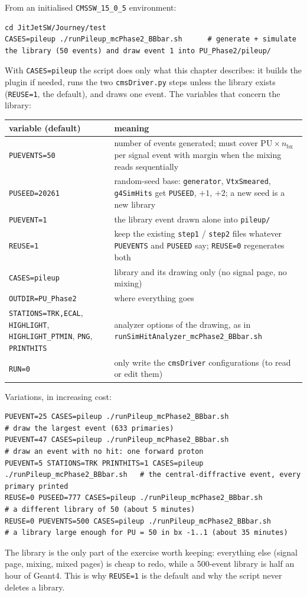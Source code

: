 \documentclass[11pt,a4paper]{article}
\newcommand{\code}[1]{\texttt{#1}}
\newcommand{\bx}{\ensuremath{\mathrm{bx}}}
\begin{document}
From an initialised \code{CMSSW\_15\_0\_5} environment:
\begin{lstlisting}[style=sh]
cd JitJetSW/Journey/test
CASES=pileup ./runPileup_mcPhase2_BBbar.sh      # generate + simulate the library (50 events) and draw event 1 into PU_Phase2/pileup/
\end{lstlisting}
With \code{CASES=pileup} the script does only what this chapter describes: it builds the plugin if needed,
runs the two \code{cmsDriver.py} steps unless the library exists (\code{REUSE=1}, the default), and draws
one event. The variables that concern the library:
\begin{center}\small
\begin{tabularx}{\textwidth}{>{\raggedright\arraybackslash}p{50mm}X}
\toprule
variable (default) & meaning \\
\midrule
\code{PUEVENTS=50} & number of events generated; must cover $\mathrm{PU}\times n_{\bx}$ per signal event with
  margin when the mixing reads sequentially \\
\code{PUSEED=20261} & random-seed base: \code{generator}, \code{VtxSmeared}, \code{g4SimHits} get
  \code{PUSEED}, $+1$, $+2$; a new seed is a new library \\
\code{PUEVENT=1} & the library event drawn alone into \code{pileup/} \\
\code{REUSE=1} & keep the existing \code{step1} / \code{step2} files whatever \code{PUEVENTS} and
  \code{PUSEED} say; \code{REUSE=0} regenerates both \\
\code{CASES=pileup} & library and its drawing only (no signal page, no mixing) \\
\code{OUTDIR=PU\_Phase2} & where everything goes \\
\code{STATIONS=TRK,ECAL}, \code{HIGHLIGHT}, \code{HIGHLIGHT\_PTMIN}, \code{PNG}, \code{PRINTHITS} & analyzer
  options of the drawing, as in \code{runSimHitAnalyzer\_mcPhase2\_BBbar.sh} \\
\code{RUN=0} & only write the \code{cmsDriver} configurations (to read or edit them) \\
\bottomrule
\end{tabularx}
\end{center}
Variations, in increasing cost:
\begin{lstlisting}[style=sh]
PUEVENT=25 CASES=pileup ./runPileup_mcPhase2_BBbar.sh                 # draw the largest event (633 primaries)
PUEVENT=47 CASES=pileup ./runPileup_mcPhase2_BBbar.sh                 # draw an event with no hit: one forward proton
PUEVENT=5 STATIONS=TRK PRINTHITS=1 CASES=pileup ./runPileup_mcPhase2_BBbar.sh   # the central-diffractive event, every primary printed
REUSE=0 PUSEED=777 CASES=pileup ./runPileup_mcPhase2_BBbar.sh         # a different library of 50 (about 5 minutes)
REUSE=0 PUEVENTS=500 CASES=pileup ./runPileup_mcPhase2_BBbar.sh       # a library large enough for PU = 50 in bx -1..1 (about 35 minutes)
\end{lstlisting}
The library is the only part of the exercise worth keeping: everything else (signal page, mixing, mixed
pages) is cheap to redo, while a 500-event library is half an hour of Geant4. This is why \code{REUSE=1}
is the default and why the script never deletes a library.
\end{document}
